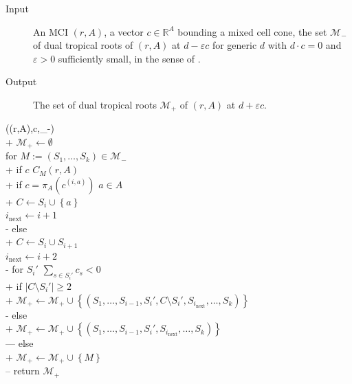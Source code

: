 \documentclass[a4paper]{article}
\theoremstyle{remark}
\newcommand{\set}[1]{\left\{#1\right\}}
\def\RR{\mathbb{R}}
\begin{document}
\begin{algorithm}
  \caption{Tropical Homotopy Continuation for MCI's}
  \label{alg:thc}
  \raggedright

  \begin{description}
  \item[Input] An MCI $(r,A)$, a vector $c\in \RR^A$ bounding a mixed cell cone, the set $\mathcal{M}_{-}$ of dual tropical roots of
    $(r,A)$ at $d-\varepsilon c$ for generic $d$ with $d\cdot c = 0$ and $\varepsilon>0$ sufficiently small, in
    the sense of .
  \item[Output] The set of dual tropical roots $\mathcal{M}_+$ of $(r,A)$ at $d + \varepsilon c$.
  \end{description}

  \begin{pseudo}
     ((r,A),c,_-)\\+
    $\mathcal{M}_+\gets \emptyset$\\
    for $M:=(S_1,\ldots,S_k)\in \mathcal{M}_-$\\+
    if $c$  $C_M(r,A)$\\+
    if $c = \pi_A(c^{(i,a)})$  $a\in A$\\+
    $C \gets S_i\cup \set{a}$\\
    $i_{\text{next}}\gets i + 1$\\-
    else\\+
    $C\gets S_i\cup S_{i+1}$\\
    $i_{\text{next}}\gets i + 2$\\-
    for  $S_i'$   $\sum_{s\in S_i'}c_s< 0$\\+
    if $|C\setminus S_i'| \geq 2$\\+
    $\mathcal{M}_+\gets \mathcal{M}_+\cup \set{(S_1,\hdots,S_{i-1},S_i',C\setminus S_i',S_{i_{\text{next}}},\hdots,S_k)}$\\-
    else\\+
    $\mathcal{M}_+\gets  \mathcal{M}_+\cup \set{(S_1,\hdots,S_{i-1},S_i',S_{i_{\text{next}}},\hdots,S_k)}$\\---
    else\\+
    $\mathcal{M}_+\gets \mathcal{M}_+\cup \set{M}$\\--
    return $\mathcal{M}_+$
  \end{pseudo}


\end{algorithm}
\end{document}
